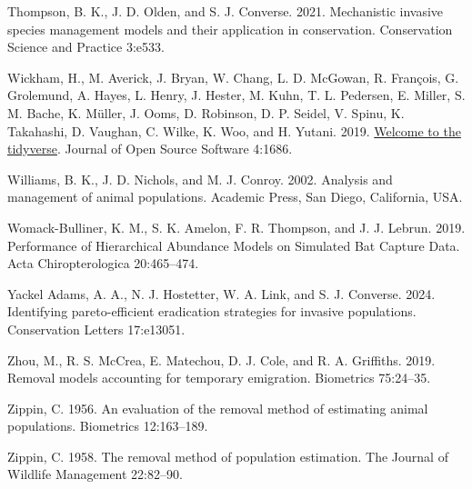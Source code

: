 \documentclass[
  11pt,
  a4paper,
]{article}
\newlength{\cslhangindent}
\newenvironment{CSLReferences}[2] %
 {\begin{list}{}{%
  \setlength{\itemindent}{0pt}
  \setlength{\leftmargin}{0pt}
  \setlength{\parsep}{0pt}
  \ifodd #1
   \setlength{\leftmargin}{\cslhangindent}
   \setlength{\itemindent}{-1\cslhangindent}
  \fi
  \setlength{\itemsep}{#2\baselineskip}}}
 {\end{list}}
\begin{document}
\begin{CSLReferences}{1}{0}
Thompson, B. K., J. D. Olden, and S. J. Converse. 2021. Mechanistic invasive species management models and their application in conservation. Conservation Science and Practice 3:e533.

Wickham, H., M. Averick, J. Bryan, W. Chang, L. D. McGowan, R. François, G. Grolemund, A. Hayes, L. Henry, J. Hester, M. Kuhn, T. L. Pedersen, E. Miller, S. M. Bache, K. Müller, J. Ooms, D. Robinson, D. P. Seidel, V. Spinu, K. Takahashi, D. Vaughan, C. Wilke, K. Woo, and H. Yutani. 2019. \href{https://doi.org/10.21105/joss.01686}{Welcome to the {tidyverse}}. Journal of Open Source Software 4:1686.

Williams, B. K., J. D. Nichols, and M. J. Conroy. 2002. Analysis and management of animal populations. Academic Press, San Diego, California, USA.

Womack-Bulliner, K. M., S. K. Amelon, F. R. Thompson, and J. J. Lebrun. 2019. {Performance of Hierarchical Abundance Models on Simulated Bat Capture Data}. Acta Chiropterologica 20:465--474.

Yackel Adams, A. A., N. J. Hostetter, W. A. Link, and S. J. Converse. 2024. Identifying pareto-efficient eradication strategies for invasive populations. Conservation Letters 17:e13051.

Zhou, M., R. S. McCrea, E. Matechou, D. J. Cole, and R. A. Griffiths. 2019. Removal models accounting for temporary emigration. Biometrics 75:24--35.

Zippin, C. 1956. An evaluation of the removal method of estimating animal populations. Biometrics 12:163--189.

Zippin, C. 1958. The removal method of population estimation. The Journal of Wildlife Management 22:82--90.

\end{CSLReferences}
\end{document}
